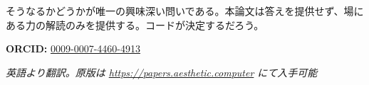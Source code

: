 \documentclass[10pt,letterpaper,twocolumn]{article}
\begin{document}
そうなるかどうかが唯一の興味深い問いである。本論文は答えを提供せず、場にある力の解読のみを提供する。コードが決定するだろう。

\vspace{0.5em}
\noindent\textbf{ORCID:} \href{https://orcid.org/0009-0007-4460-4913}{0009-0007-4460-4913}

\vspace{0.5em}\noindent\textit{英語より翻訳。原版は \url{https://papers.aesthetic.computer} にて入手可能}




\end{document}
